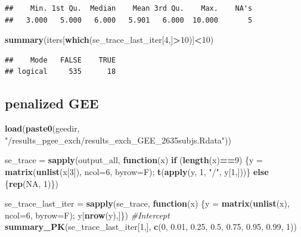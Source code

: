 \documentclass[]{article}
\newenvironment{Shaded}{\begin{snugshade}}{\end{snugshade}}
\newcommand{\CommentTok}[1]{\textcolor[rgb]{0.56,0.35,0.01}{\textit{#1}}}
\newcommand{\ControlFlowTok}[1]{\textcolor[rgb]{0.13,0.29,0.53}{\textbf{#1}}}
\newcommand{\DataTypeTok}[1]{\textcolor[rgb]{0.13,0.29,0.53}{#1}}
\newcommand{\DecValTok}[1]{\textcolor[rgb]{0.00,0.00,0.81}{#1}}
\newcommand{\FloatTok}[1]{\textcolor[rgb]{0.00,0.00,0.81}{#1}}
\newcommand{\KeywordTok}[1]{\textcolor[rgb]{0.13,0.29,0.53}{\textbf{#1}}}
\newcommand{\NormalTok}[1]{#1}
\newcommand{\OperatorTok}[1]{\textcolor[rgb]{0.81,0.36,0.00}{\textbf{#1}}}
\newcommand{\OtherTok}[1]{\textcolor[rgb]{0.56,0.35,0.01}{#1}}
\newcommand{\StringTok}[1]{\textcolor[rgb]{0.31,0.60,0.02}{#1}}
\begin{document}
\begin{verbatim}
##    Min. 1st Qu.  Median    Mean 3rd Qu.    Max.    NA's 
##   3.000   5.000   6.000   5.901   6.000  10.000       5
\end{verbatim}

\begin{Shaded}
\begin{Highlighting}[]
\KeywordTok{summary}\NormalTok{(iters[}\KeywordTok{which}\NormalTok{(se_trace_last_iter[}\DecValTok{4}\NormalTok{,]}\OperatorTok{>}\DecValTok{10}\NormalTok{)]}\OperatorTok{<}\DecValTok{10}\NormalTok{)}
\end{Highlighting}
\end{Shaded}

\begin{verbatim}
##    Mode   FALSE    TRUE 
## logical     535      18
\end{verbatim}

\hypertarget{penalized-gee}{%
\subsection{penalized GEE}\label{penalized-gee}}

\begin{Shaded}
\begin{Highlighting}[]
\KeywordTok{load}\NormalTok{(}\KeywordTok{paste0}\NormalTok{(geedir, }\StringTok{"/results_pgee_exch/results_exch_GEE_2635subjs.Rdata"}\NormalTok{))}

\NormalTok{se_trace =}\StringTok{ }\KeywordTok{sapply}\NormalTok{(output_all, }\ControlFlowTok{function}\NormalTok{(x) }\ControlFlowTok{if}\NormalTok{ (}\KeywordTok{length}\NormalTok{(x)}\OperatorTok{==}\DecValTok{9}\NormalTok{) \{y =}\StringTok{ }\KeywordTok{matrix}\NormalTok{(}\KeywordTok{unlist}\NormalTok{(x[}\DecValTok{3}\NormalTok{]), }\DataTypeTok{ncol=}\DecValTok{6}\NormalTok{, }\DataTypeTok{byrow=}\NormalTok{F); }\KeywordTok{t}\NormalTok{(}\KeywordTok{apply}\NormalTok{(y, }\DecValTok{1}\NormalTok{, }\StringTok{"/"}\NormalTok{, y[}\DecValTok{1}\NormalTok{,]))\} }\ControlFlowTok{else}\NormalTok{ \{}\KeywordTok{rep}\NormalTok{(}\OtherTok{NA}\NormalTok{, }\DecValTok{1}\NormalTok{)\})}

\NormalTok{se_trace_last_iter =}\StringTok{ }\KeywordTok{sapply}\NormalTok{(se_trace, }\ControlFlowTok{function}\NormalTok{(x) \{y =}\StringTok{ }\KeywordTok{matrix}\NormalTok{(}\KeywordTok{unlist}\NormalTok{(x), }\DataTypeTok{ncol=}\DecValTok{6}\NormalTok{, }\DataTypeTok{byrow=}\NormalTok{F); y[}\KeywordTok{nrow}\NormalTok{(y),]\})}
\CommentTok{#Intercept}
\KeywordTok{summary_PK}\NormalTok{(se_trace_last_iter[}\DecValTok{1}\NormalTok{,], }\KeywordTok{c}\NormalTok{(}\DecValTok{0}\NormalTok{, }\FloatTok{0.01}\NormalTok{, }\FloatTok{0.25}\NormalTok{, }\FloatTok{0.5}\NormalTok{, }\FloatTok{0.75}\NormalTok{, }\FloatTok{0.95}\NormalTok{, }\FloatTok{0.99}\NormalTok{, }\DecValTok{1}\NormalTok{))}
\end{Highlighting}
\end{Shaded}
\end{document}
